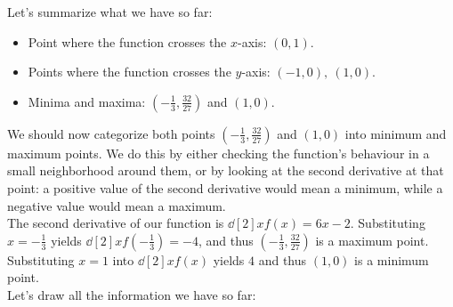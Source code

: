 \begin{enumerate}
{\begin{answer}
\begin{enumerate}
								Let's summarize what we have so far:
								\begin{itemize}
									\item Point where the function crosses the $x$-axis: $\left( 0, 1\right)$.
									\item Points where the function crosses the $y$-axis: $\left( -1,0 \right),\ \left( 1,0 \right)$.
									\item Minima and maxima: $\left( -\frac{1}{3}, \frac{32}{27} \right)$ and $\left( 1, 0 \right)$.
								\end{itemize}

								We should now categorize both points $\left( -\frac{1}{3}, \frac{32}{27} \right)$ and $\left( 1, 0 \right)$ into minimum and maximum points. We do this by either checking the function's behaviour in a small neighborhood around them, or by looking at the second derivative at that point: a positive value of the second derivative would mean a minimum, while a negative value would mean a maximum\footnotemark{}.\\

								The second derivative of our function is $\dd[2]{x}f\left( x \right)=6x-2$. Substituting $x=-\frac{1}{3}$ yields $\dd[2]{x}f\left( -\frac{1}{3} \right)=-4$, and thus $\left( -\frac{1}{3}, \frac{32}{27} \right)$ is a maximum point. Substituting $x=1$ into $\dd[2]{x}f\left( x \right)$ yields $4$ and thus $\left( 1, 0 \right)$ is a minimum point.\\

								Let's draw all the information we have so far:
								\begin{figure}[H]
									\centering
								\end{figure}


\end{enumerate}
\end{answer}}
\end{enumerate}

